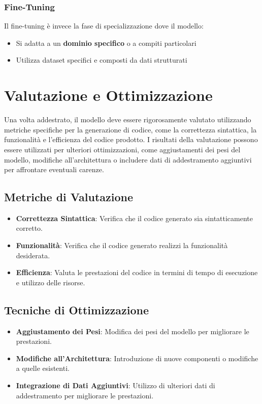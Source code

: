 \documentclass[12pt,a4paper,openright,twoside]{book}
\begin{document}
\subsubsection{Fine-Tuning}
Il fine-tuning è invece la fase di specializzazione dove il modello:
\begin{itemize}
    \item Si adatta a un \textbf{dominio specifico} o a compiti particolari
    \item Utilizza dataset specifici e composti da dati strutturati 
\end{itemize}
\section{Valutazione e Ottimizzazione}
Una volta addestrato, il modello deve essere rigorosamente valutato utilizzando metriche specifiche per la generazione di codice, come la correttezza sintattica, la funzionalità e l'efficienza del codice prodotto.
I risultati della valutazione possono essere utilizzati per ulteriori ottimizzazioni, come aggiustamenti dei pesi del modello, modifiche all'architettura o includere dati di addestramento aggiuntivi per affrontare eventuali carenze.

\subsection{Metriche di Valutazione}
\begin{itemize}
    \item \textbf{Correttezza Sintattica}: Verifica che il codice generato sia sintatticamente corretto.
    \item \textbf{Funzionalità}: Verifica che il codice generato realizzi la funzionalità desiderata.
    \item \textbf{Efficienza}: Valuta le prestazioni del codice in termini di tempo di esecuzione e utilizzo delle risorse.
\end{itemize}

\subsection{Tecniche di Ottimizzazione}
\begin{itemize}
    \item \textbf{Aggiustamento dei Pesi}: Modifica dei pesi del modello per migliorare le prestazioni.
    \item \textbf{Modifiche all'Architettura}: Introduzione di nuove componenti o modifiche a quelle esistenti.
    \item \textbf{Integrazione di Dati Aggiuntivi}: Utilizzo di ulteriori dati di addestramento per migliorare le prestazioni.
\end{itemize}
\end{document}
